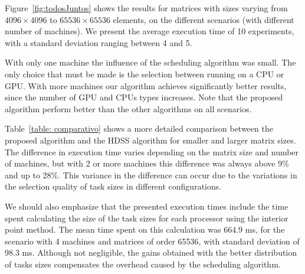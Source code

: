 \documentclass[journal]{IEEEtran}
\begin{document}

Figure~\ref{fig:todosJuntos} shows the results for matrices with sizes varying from $4096 \times 4096$ to $65536 \times 65536$ elements, on the different scenarios (with different number of machines). We present the average execution time of 10 experiments, with a standard deviation ranging between 4 and 5.

With
only one machine the influence of the scheduling algorithm was small. The only choice that must be made is the selection between running on a 
CPU or GPU.
With more machines our algorithm achieves significantly better
results, since the number of GPU and CPUs types increases. Note that  the proposed algorithm perform better than the other algorithms on
all scenarios.

Table~\ref{table: comparativo} shows a more detailed comparison between the
proposed algorithm and the HDSS algorithm for smaller and larger matrix sizes. The
difference in execution time varies depending on the matrix size and number of
machines, but with 2 or more machines this difference was always above 9\% and up to
28\%. This variance in the difference can occur due to the variations in the
selection quality of task sizes in different configurations.

%
We should also emphasize that the presented execution times include the time spent
calculating the size of the task sizes for each processor using the interior
point method. The mean time spent on this calculation was 664.9 ms, for the scenario with 4 machines and matrices of order 65536, with
standard deviation of 98.3 ms. Although not negligible, the gains obtained with
the better distribution of tasks sizes compensates the overhead caused by the scheduling algorithm.

\end{document}
